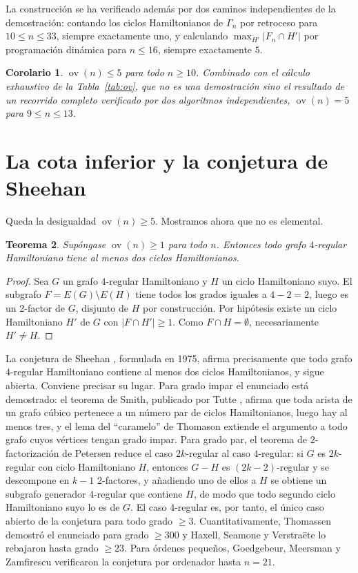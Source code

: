 \documentclass[11pt,a4paper]{article}
\newtheorem{teorema}{Teorema}[section]
\newtheorem{corolario}[teorema]{Corolario}
\theoremstyle{definition}
\theoremstyle{remark}
\newcommand{\ov}{\operatorname{ov}}
\begin{document}
La construcción se ha verificado además por dos caminos independientes de la demostración: contando los ciclos Hamiltonianos de $\Gamma_n$ por retroceso para $10\le n\le33$, siempre exactamente uno, y calculando $\max_{H'}|F_n\cap H'|$ por programación dinámica para $n\le16$, siempre exactamente $5$.

\begin{corolario}\label{cor:exacto}
$\ov(n)\le5$ para todo $n\ge10$. Combinado con el cálculo exhaustivo de la Tabla~\ref{tab:ov}, que no es una demostración sino el resultado de un recorrido completo verificado por dos algoritmos independientes, $\ov(n)=5$ para $9\le n\le13$.
\end{corolario}

\section{La cota inferior y la conjetura de Sheehan}\label{sec:sheehan}

Queda la desigualdad $\ov(n)\ge5$. Mostramos ahora que no es elemental.

\begin{teorema}\label{thm:sheehan}
Supóngase $\ov(n)\ge1$ para todo $n$. Entonces todo grafo $4$-regular Hamiltoniano tiene al menos dos ciclos Hamiltonianos.
\end{teorema}

\begin{proof}
Sea $G$ un grafo $4$-regular Hamiltoniano y $H$ un ciclo Hamiltoniano suyo. El subgrafo $F=E(G)\setminus E(H)$ tiene todos los grados iguales a $4-2=2$, luego es un 2-factor de $G$, disjunto de $H$ por construcción. Por hipótesis existe un ciclo Hamiltoniano $H'$ de $G$ con $|F\cap H'|\ge1$. Como $F\cap H=\emptyset$, necesariamente $H'\ne H$.
\end{proof}

La conjetura de Sheehan \cite{sheehan}, formulada en 1975, afirma precisamente que todo grafo $4$-regular Hamiltoniano contiene al menos dos ciclos Hamiltonianos, y sigue abierta. Conviene precisar su lugar. Para grado impar el enunciado está demostrado: el teorema de Smith, publicado por Tutte \cite{tutte46}, afirma que toda arista de un grafo cúbico pertenece a un número par de ciclos Hamiltonianos, luego hay al menos tres, y el lema del ``caramelo'' de Thomason \cite{thomason78} extiende el argumento a todo grafo cuyos vértices tengan grado impar. Para grado par, el teorema de $2$-factorización de Petersen reduce el caso $2k$-regular al caso $4$-regular: si $G$ es $2k$-regular con ciclo Hamiltoniano $H$, entonces $G-H$ es $(2k-2)$-regular y se descompone en $k-1$ 2-factores, y añadiendo uno de ellos a $H$ se obtiene un subgrafo generador $4$-regular que contiene $H$, de modo que todo segundo ciclo Hamiltoniano suyo lo es de $G$. El caso $4$-regular es, por tanto, el único caso abierto de la conjetura para todo grado $\ge3$. Cuantitativamente, Thomassen \cite{thomassen98} demostró el enunciado para grado $\ge300$ y Haxell, Seamone y Verstraëte \cite{hsv} lo rebajaron hasta grado $\ge23$. Para órdenes pequeños, Goedgebeur, Meersman y Zamfirescu \cite{gmz20} verificaron la conjetura por ordenador hasta $n=21$.
\end{document}
